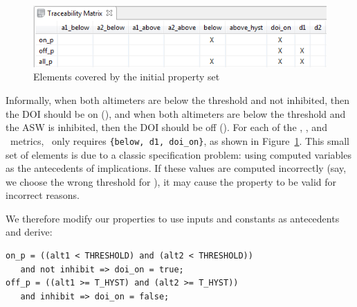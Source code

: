 \begin{figure}
  \centering
  \includegraphics[width=\columnwidth]{figs/spear_set1.png}
  \vspace{-0.1in}
  \caption{Elements covered by the initial property set}
  \vspace{-0.1in}
  \label{fig:propertyset1}
\end{figure}


\noindent Informally, when both altimeters are below the threshold and not inhibited, then the DOI should be on (\onp), and when both altimeters are below the threshold and the ASW is inhibited, then the DOI should be off (\offp).
For each of the \ivccov, \maycov, and \mustcov\ metrics, \allp\ only requires \texttt{\{below, d1, doi\_on\}}, as shown in Figure~\ref{fig:propertyset1}.   This small set of elements is due to a classic specification problem: using computed variables as the antecedents of implications.  If these values are computed incorrectly (say, we choose the wrong threshold for \aonebelow), it may cause the property to be valid for incorrect reasons.


We therefore modify our properties to use inputs and constants as antecedents and derive:

{\smaller
\begin{verbatim}
on_p = ((alt1 < THRESHOLD) and (alt2 < THRESHOLD))
   and not inhibit => doi_on = true;
off_p = ((alt1 >= T_HYST) and (alt2 >= T_HYST))
   and inhibit => doi_on = false;
\end{verbatim}
}

